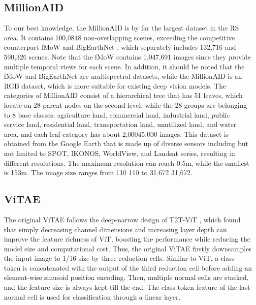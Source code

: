 \documentclass[10pt, journal,twoside]{IEEEtran}
\begin{document}
 \subsection{MillionAID}
 
 To our best knowledge, the MillionAID is by far the largest dataset in the RS area. It contains 100,0848 non-overlapping scenes, exceeding the competitive counterpart fMoW \cite{fmow} and BigEarthNet \cite{bigearthnet}, which separately includes 132,716 and 590,326 scenes. Note that the fMoW contains 1,047,691 images since they provide multiple temporal views for each scene. In addition, it should be noted that the fMoW and BigEarthNet are multispectral datasets, while the MillionAID is an RGB dataset, which is more suitable for existing deep vision models. The categories of MillionAID consist of a hierarchical tree that has 51 leaves, which locate on 28 parent nodes on the second level, while the 28 groups are belonging to 8 base classes: agriculture land, commercial land, industrial land, public service land, residential land, transportation land, unutilized land, and water area, and each leaf category has about 2,00045,000 images. This dataset is obtained from the Google Earth that is made up of diverse sensors including but not limited to SPOT, IKONOS, WorldView, and Landsat series, resulting in different resolutions. The maximum resolution can reach 0.5m, while the smallest is 153m. The image size ranges from 110  110 to 31,672  31,672.

 \subsection{ViTAE}


The original ViTAE \cite{xu2021vitae} follows the deep-narrow design of T2T-ViT \cite{t2tvit}, which found that simply decreasing channel dimensions and increasing layer depth can improve the feature richness of ViT, boosting the performance while reducing the model size and computational cost. Thus, the original ViTAE firstly downsamples the input image to 1/16 size by three reduction cells. Similar to ViT, a class token is concatenated with the output of the third reduction cell before adding an element-wise sinusoid position encoding. Then, multiple normal cells are stacked, and the feature size is always kept till the end. The class token feature of the last normal cell is used for classification through a linear layer.
\end{document}
